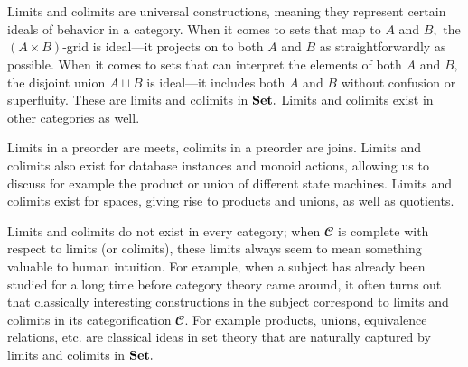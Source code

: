 \documentclass[../main/CT4S-EN-RU]{subfiles}
\begin{document}
\section{}

\begin{blockENG}
Limits and colimits are universal constructions, meaning they represent certain ideals of behavior in a category. When it comes to sets that map to $A$ and $B,$ the $(A\times B)$-grid is ideal—it projects on to both $A$ and $B$ as straightforwardly as possible. When it comes to sets that can interpret the elements of both $A$ and $B,$ the disjoint union $A\sqcup B$ is ideal—it includes both $A$ and $B$ without confusion or superfluity. These are limits and colimits in ${\mathbf{Set}}.$ Limits and colimits exist in other categories as well.
\end{blockENG}

\begin{blockRUS}
\end{blockRUS}

\begin{blockENG}
Limits in a preorder are meets, colimits in a preorder are joins. Limits and colimits also exist for database instances and monoid actions, allowing us to discuss for example the product or union of different state machines. Limits and colimits exist for spaces, giving rise to products and unions, as well as quotients.
\end{blockENG}

\begin{blockRUS}
\end{blockRUS}

\begin{blockENG}
Limits and colimits do not exist in every category; when ${𝓒}$ is complete with respect to limits (or colimits), these limits always seem to mean something valuable to human intuition. For example, when a subject has already been studied for a long time before category theory came around, it often turns out that classically interesting constructions in the subject correspond to limits and colimits in its categorification ${𝓒}.$ For example products, unions, equivalence relations, etc. are classical ideas in set theory that are naturally captured by limits and colimits in ${\mathbf{Set}}.$ 
\end{blockENG}

\begin{blockRUS}
\end{blockRUS}
\end{document}
